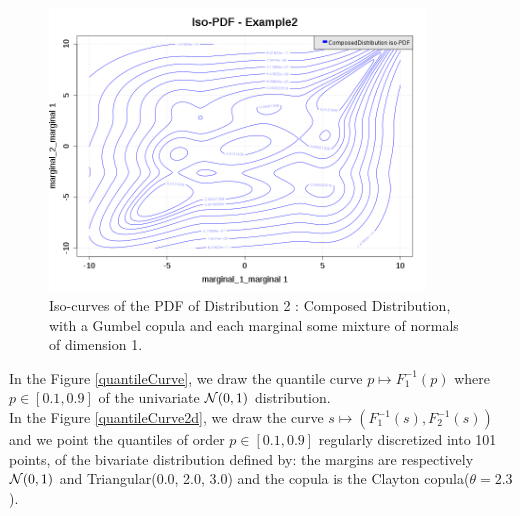 \begin{figure}[H]
  \begin{center}
    \includegraphics[width=10cm]{Figures/contour2D_2.png}
  \end{center}
  \caption{Iso-curves of the PDF of Distribution 2 : Composed Distribution, with a Gumbel copula and each marginal some mixture of normals of dimension 1.}
  \label{contour2D_example2}
\end{figure}

In the Figure \ref{quantileCurve}, we draw the quantile curve $p \mapsto F_1^{-1}(p)$ where  $p\in[0.1, 0.9]$ of the univariate ${\mathcal N}(0,1)$ distribution.\\

In the Figure \ref{quantileCurve2d}, we draw the curve  $s \mapsto (F_1^{-1}(s), F_2^{-1}(s))$  and we point the quantiles of order $p \in [0.1, 0.9]$ regularly discretized into 101 points, of the bivariate distribution defined by: the margins are respectively  ${\mathcal N}(0,1)$ and Triangular(0.0, 2.0, 3.0) and the copula is the Clayton copula($\theta=2.3$).


